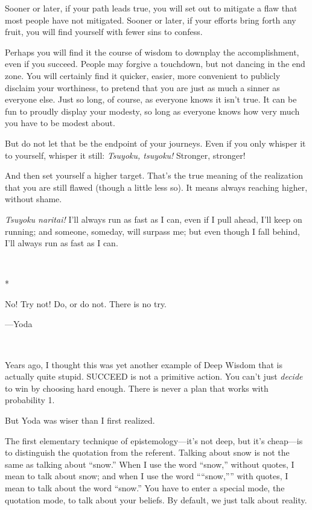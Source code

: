 {
 Sooner or later, if your path leads true, you will set out to
mitigate a flaw that most people have not mitigated. Sooner or later,
if your efforts bring forth any fruit, you will find yourself with
fewer sins to confess.}

{
 Perhaps you will find it the course of wisdom to downplay the
accomplishment, even if you succeed. People may forgive a touchdown,
but not dancing in the end zone. You will certainly find it quicker,
easier, more convenient to publicly disclaim your worthiness, to
pretend that you are just as much a sinner as everyone else. Just so
long, of course, as everyone knows it isn't true. It
can be fun to proudly display your modesty, so long as everyone knows
how very much you have to be modest about.}

{
 But do not let that be the endpoint of your journeys. Even if you
only whisper it to yourself, whisper it still: \textit{Tsuyoku,
tsuyoku!} Stronger, stronger!}

{
 And then set yourself a higher target. That's the
true meaning of the realization that you are still flawed (though a
little less so). It means always reaching higher, without shame.}

{
 \textit{Tsuyoku naritai!} I'll always run as fast
as I can, even if I pull ahead, I'll keep on running;
and someone, someday, will surpass me; but even though I fall behind,
I'll always run as fast as I can.}

{\centering
 \ ~
\par}

{\centering
 *
\par}


{
 No! Try not! Do, or do not. There is no try.}

{\raggedleft
 {}---Yoda
\par}


\bigskip

{
 ~}

{
 Years ago, I thought this was yet another example of Deep Wisdom
that is actually quite stupid. SUCCEED is not a primitive action. You
can't just \textit{decide} to win by choosing hard
enough. There is never a plan that works with probability 1.}

{
 But Yoda was wiser than I first realized.}

{
 The first elementary technique of
epistemology---it's not deep, but it's
cheap---is to distinguish the quotation from the referent. Talking
about snow is not the same as talking about
``snow.'' When I use the word
``snow,'' without quotes, I mean to
talk about snow; and when I use the word
````snow,''''
with quotes, I mean to talk about the word
``snow.'' You have to enter a
special mode, the quotation mode, to talk about your beliefs. By
default, we just talk about reality.}

